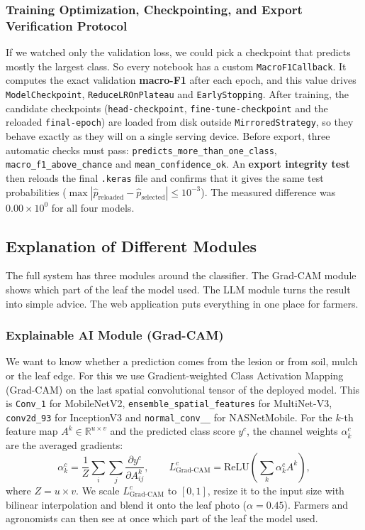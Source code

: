 \subsubsection{Training Optimization, Checkpointing, and Export Verification Protocol}
If we watched only the validation loss, we could pick a checkpoint that predicts mostly the largest class. So every notebook has a custom \texttt{MacroF1Callback}. It computes the exact validation \textbf{macro-F1} after each epoch, and this value drives \texttt{ModelCheckpoint}, \texttt{ReduceLROnPlateau} and \texttt{EarlyStopping}. After training, the candidate checkpoints (\texttt{head-checkpoint}, \texttt{fine-tune-checkpoint} and the reloaded \texttt{final-epoch}) are loaded from disk outside \texttt{MirroredStrategy}, so they behave exactly as they will on a single serving device. Before export, three automatic checks must pass: \texttt{predicts\_\allowbreak more\_\allowbreak than\_\allowbreak one\_\allowbreak class}, \texttt{macro\_\allowbreak f1\_\allowbreak above\_\allowbreak chance} and \texttt{mean\_\allowbreak confidence\_\allowbreak ok}. An \textbf{export integrity test} then reloads the final \texttt{.keras} file and confirms that it gives the same test probabilities ($\max |\hat{p}_{\text{reloaded}} - \hat{p}_{\text{selected}}| \le 10^{-3}$). The measured difference was $0.00 \times 10^{0}$ for all four models.

\subsection{Explanation of Different Modules}
The full system has three modules around the classifier. The Grad-CAM module shows which part of the leaf the model used. The LLM module turns the result into simple advice. The web application puts everything in one place for farmers.

\subsubsection{Explainable AI Module (Grad-CAM)}
We want to know whether a prediction comes from the lesion or from soil, mulch or the leaf edge. For this we use Gradient-weighted Class Activation Mapping (Grad-CAM) \cite{selvaraju2017grad} on the last spatial convolutional tensor of the deployed model. This is \texttt{Conv\_1} for MobileNetV2, \texttt{ensemble\_\allowbreak spatial\_\allowbreak features} for MultiNet-V3, \texttt{conv2d\_93} for InceptionV3 and \texttt{normal\_\allowbreak conv\_\_} for NASNetMobile. For the $k$-th feature map $A^k \in \mathbb{R}^{u \times v}$ and the predicted class score $y^c$, the channel weights $\alpha_k^c$ are the averaged gradients:
\begin{equation}
\alpha_k^c = \frac{1}{Z} \sum_{i} \sum_{j} \frac{\partial y^c}{\partial A_{ij}^k}, \qquad
L_{\text{Grad-CAM}}^c = \text{ReLU}\!\left(\sum_{k} \alpha_k^c A^k\right),
\end{equation}
where $Z = u \times v$. We scale $L_{\text{Grad-CAM}}^c$ to $[0, 1]$, resize it to the input size with bilinear interpolation and blend it onto the leaf photo ($\alpha = 0.45$). Farmers and agronomists can then see at once which part of the leaf the model used.

